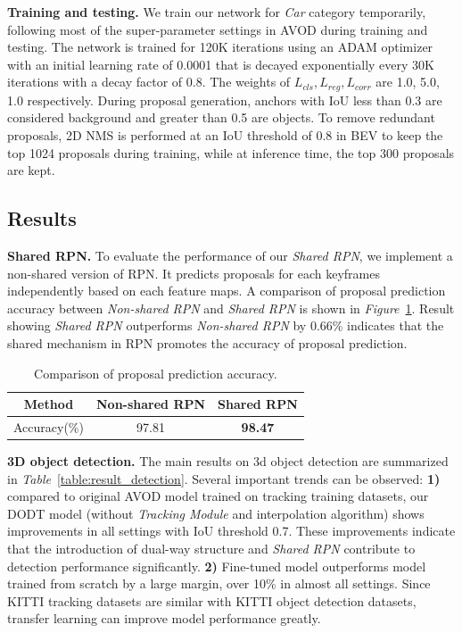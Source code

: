 \documentclass[letterpaper, 10 pt, conference]{ieeeconf}  %
\def\figurename{\emph{Figure}}
\def\tablename{\emph{Table}}
\begin{document}
\textbf{Training and testing.} We train our network for \textit{Car} category temporarily, following most of the super-parameter settings in AVOD \cite{ku2018joint} during training and testing. The network is trained for 120K iterations using an ADAM \cite{kingma2014adam} optimizer with an initial learning rate of 0.0001 that is decayed exponentially every 30K iterations with a decay factor of 0.8. The weights of $L_{cls}, L_{reg}, L_{corr}$ are 1.0, 5.0, 1.0 respectively. During proposal generation, anchors with IoU less than 0.3 are considered background and greater than 0.5 are objects. To remove redundant proposals, 2D NMS is performed at an IoU threshold of 0.8 in BEV to keep the top 1024 proposals during training, while at inference time, the top 300 proposals are kept.

\subsection{Results}
\textbf{Shared RPN.} To evaluate the performance of our \textit{Shared RPN}, we implement a non-shared version of RPN. It predicts proposals for each keyframes independently based on each feature maps. A comparison of proposal prediction accuracy between \textit{Non-shared RPN} and \textit{Shared RPN} is shown in \figurename \, \ref{table:rpn_result}. Result showing \textit{Shared RPN} outperforms \textit{Non-shared RPN} by 0.66\% indicates that the shared mechanism in RPN promotes the accuracy of proposal prediction. 
\begin{table}[h]\centering
	\vspace{-0.2cm}
		\begin{tabular}{ccc}
			\toprule[1pt]
			Method        & Non-shared RPN & Shared RPN  \\ \midrule
			Accuracy(\%)  & 97.81      & \textbf{98.47}       \\
			\bottomrule[1pt]
	\end{tabular}
	\caption{Comparison of proposal prediction accuracy.}
	\label{table:rpn_result}
	\vspace{-0.2cm}
\end{table}

\textbf{3D object detection.} The main results on 3d object detection are summarized in \tablename \, \ref{table:result_detection}. Several important trends can be observed: \textbf{1)} compared to original AVOD \cite{ku2018joint} model trained on tracking training datasets, our DODT model (without \textit{Tracking Module} and interpolation algorithm) shows improvements in all settings with IoU threshold 0.7. These improvements indicate that the introduction of dual-way structure and \textit{Shared RPN} contribute to detection performance significantly. \textbf{2)} Fine-tuned model outperforms model trained from scratch by a large margin, over 10\% in almost all settings. Since KITTI tracking datasets are similar with KITTI object detection datasets, transfer learning can improve model performance greatly. 
\end{document}
